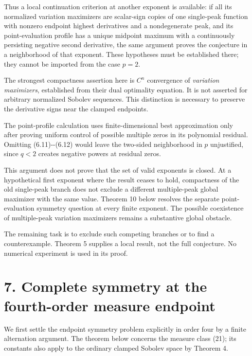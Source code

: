 \documentclass[11pt]{article}
\begin{document}
Thus a local continuation criterion at another exponent is available: if
all its normalized variation maximizers are scalar-sign copies of one
single-peak function with nonzero endpoint highest derivatives and a
nondegenerate peak, and its point-evaluation profile has a unique
midpoint maximum with a continuously persisting negative second
derivative, the same argument proves the conjecture in a neighborhood of
that exponent. These hypotheses must be established there; they cannot
be imported from the case \(p=2\).

The strongest compactness assertion here is \(C^n\) convergence of
\emph{variation maximizers}, established from their dual optimality
equation. It is not asserted for arbitrary normalized Sobolev sequences.
This distinction is necessary to preserve the derivative signs near the
clamped endpoints.

The point-profile calculation uses finite-dimensional best approximation
only after proving uniform control of possible multiple zeros in its
polynomial residual. Omitting (6.11)-\/-(6.12) would leave the two-sided
neighborhood in \(p\) unjustified, since \(q<2\) creates negative powers
at residual zeros.

This argument does not prove that the set of valid exponents is closed.
At a hypothetical first exponent where the result ceases to hold,
compactness of the old single-peak branch does not exclude a different
multiple-peak global maximizer with the same value. Theorem 10 below
resolves the separate point-evaluation symmetry question at every finite
exponent. The possible coexistence of multiple-peak variation maximizers
remains a substantive global obstacle.

The remaining task is to exclude such competing branches or to find a
counterexample. Theorem 5 supplies a local result, not the full
conjecture. No numerical experiment is used in its proof.

\section{7. Complete symmetry at the fourth-order measure
endpoint}\label{complete-symmetry-at-the-fourth-order-measure-endpoint}

We first settle the endpoint symmetry problem explicitly in order four
by a finite alternation argument. The theorem below concerns the measure
class (21); its constants also apply to the ordinary clamped Sobolev
space by Theorem 4.
\end{document}
